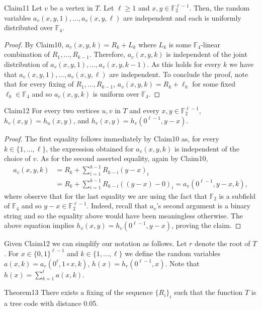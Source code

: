 \begin{authorclaim}{Claim11}
Let $v$ be a vertex in $T$. Let $\ell\ge1$ and $x,y\in\mathbb F_2^{\ell-1}$. Then, the random variables $a_v(x,y,1),\ldots,a_v(x,y,\ell)$ are independent and each is uniformly distributed over $\mathbb F_4$.
\end{authorclaim}
\begin{proof}
By Claim10, $a_v(x,y,k)=R_k+L_k$ where $L_k$ is some $\mathbb F_4$-linear combination of $R_1,\ldots,R_{k-1}$. Therefore, $a_v(x,y,k)$ is independent of the joint distribution of $a_v(x,y,1),\ldots,a_v(x,y,k-1)$. As this holds for every $k$ we have that $a_v(x,y,1),\ldots,a_v(x,y,\ell)$ are independent. To conclude the proof, note that for every fixing of $R_1,\ldots,R_{k-1}$, $a_v(x,y,k)=R_k+\ell_k$ for some fixed $\ell_k\in\mathbb F_4$ and so $a_v(x,y,k)$ is uniform over $\mathbb F_4$.
\end{proof}
\begin{authorclaim}{Claim12}
For every two vertices $u,v$ in $T$ and every $x,y\in\mathbb F_2^{\ell-1}$, $h_v(x,y)=h_u(x,y)$, and $h_v(x,y)=h_v(0^{\ell-1},y-x)$.
\end{authorclaim}
\begin{proof}
The first equality follows immediately by Claim10 as, for every $k\in\{1,\ldots,\ell\}$, the expression obtained for $a_v(x,y,k)$ is independent of the choice of $v$. As for the second asserted equality, again by Claim10,
\begin{align*}
a_v(x,y,k)&=R_k+\sum_{i=1}^{k-1}R_{k-i}(y-x)_i\\
&=R_k+\sum_{i=1}^{k-1}R_{k-i}((y-x)-0)_i
=a_v(0^{\ell-1},y-x,k),
\end{align*}
where observe that for the last equality we are using the fact that $\mathbb F_2$ is a subfield of $\mathbb F_4$ and so $y-x\in\mathbb F_2^{\ell-1}$. Indeed, recall that $a_v$'s second argument is a binary string and so the equality above would have been meaningless otherwise. The above equation implies $h_v(x,y)=h_v(0^{\ell-1},y-x)$, proving the claim.
\end{proof}
Given Claim12 we can simplify our notation as follows. Let $r$ denote the root of $T$. For $x\in\{0,1\}^{\ell-1}$ and $k\in\{1,\ldots,\ell\}$ we define the random variables $a(x,k)=a_r(0^\ell,1\circ x,k)$, $h(x)=h_r(0^{\ell-1},x)$. Note that $h(x)=\sum_{k=1}^\ell a(x,k)$.
\begin{authorclaim}{Theorem13}
There exists a fixing of the sequence $\{R_i\}_i$ such that the function $T$ is a tree code with distance 0.05.
\end{authorclaim}
